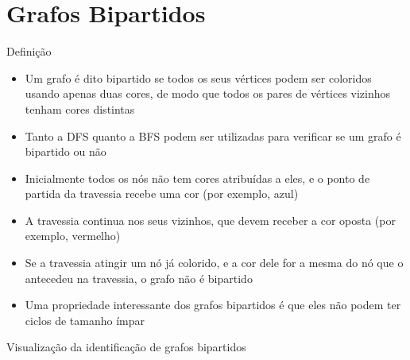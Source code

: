 \section{Grafos Bipartidos}

\begin{frame}[fragile]{Definição}

    \begin{itemize}
        \item Um grafo é dito bipartido se todos os seus vértices podem ser coloridos usando
            apenas duas cores, de modo que todos os pares de vértices vizinhos tenham cores
            distintas

        \item Tanto a DFS quanto a BFS podem ser utilizadas para verificar se um grafo é 
            bipartido ou não

        \item Inicialmente todos os nós não tem cores atribuídas a eles, e o ponto de partida
            da travessia recebe uma cor (por exemplo, azul)

        \item A travessia continua nos seus vizinhos, que devem receber a cor oposta 
            (por exemplo, vermelho)

        \item Se a travessia atingir um nó já colorido, e a cor dele for a mesma do
            nó que o antecedeu na travessia, o grafo não é bipartido

        \item Uma propriedade interessante dos grafos bipartidos é que eles não podem ter
            ciclos de tamanho ímpar
    \end{itemize}

\end{frame}

\begin{frame}[fragile]{Visualização da identificação de grafos bipartidos}


\end{frame}

